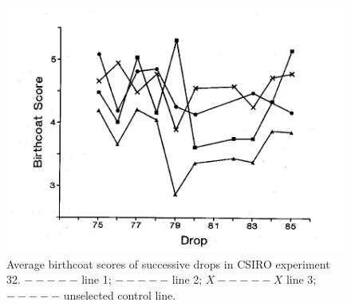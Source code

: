 %

\begin{figure}[h]
  \centering
  \includegraphics[width=\textwidth,trim = 0 0 0 120]{images/fig12.png}
  \caption{Average birthcoat scores of successive drops in CSIRO experiment
      32. $-----$ line 1;  $-----$ line 2; $X-----X$
      line 3;  $-----$  unselected control line.}
  \label{fig:12}
\end{figure}

%
